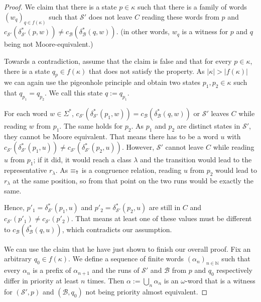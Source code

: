 \begin{proof}
	\vspace{5pt}
	
	We claim that there is a state $p \in \kappa$ such that there is a family of words $(w_q)_{q \in f(\kappa)}$ such that $\mathcal{S}'$ does not leave $C$ reading these words from $p$ and $c_{\mathcal{S}'}(\delta_{\mathcal{S}'}^*(p, w)) \neq c_{\mathcal{B}}(\delta_{\mathcal{B}}^*(q, w))$. (in other words, $w_q$ is a witness for $p$ and $q$ being not Moore-equivalent.)
	
	Towards a contradiction, assume that the claim is false and that for every $p \in \kappa$, there is a state $q_p \in f(\kappa)$ that does not satisfy the property. As $|\kappa| > |f(\kappa)|$ we can again use the pigeonhole principle and obtain two states $p_1, p_2 \in \kappa$ such that $q_{p_1} = q_{p_2}$. We call this state $q := q_{p_1}$.
	
	For each word $w \in \Sigma^*$, $c_{\mathcal{S}'}(\delta^*_{\mathcal{S'}}(p_1, w)) = c_{\mathcal{B}}(\delta^*_{\mathcal{B}}(q, w))$ or $\mathcal{S}'$ leaves $C$ while reading $w$ from $p_1$. The same holds for $p_2$. As $p_1$ and $p_2$ are distinct states in $\mathcal{S}'$, they cannot be Moore equivalent. That means there has to be a word $u$ with $c_{\mathcal{S}'}(\delta^*_{\mathcal{S'}}(p_1, u)) \neq c_{\mathcal{S}'}(\delta^*_{\mathcal{S'}}(p_2, u))$. However, $\mathcal{S}'$ cannot leave $C$ while reading $u$ from $p_1$; if it did, it would reach a class $\lambda$ and the transition would lead to the representative $r_\lambda$. As $\equiv_\text{\Ankh}$ is a congruence relation, reading $u$ from $p_2$ would lead to $r_\lambda$ at the same position, so from that point on the two runs would be exactly the same.
	
	Hence, $p'_1 = \delta_{\mathcal{S}'}^*(p_1, u)$ and $p'_2 = \delta_{\mathcal{S}'}^*(p_2, u)$ are still in $C$ and $c_{\mathcal{S}'}(p'_1) \neq c_{\mathcal{S}'}(p'_2)$. That means at least one of these values must be different to $c_{\mathcal{B}}(\delta_{\mathcal{B}}^*(q, u))$, which contradicts our assumption.
	
	\vspace{5pt}
	
	We can use the claim that he have just shown to finish our overall proof. Fix an arbitrary $q_0 \in f(\kappa)$. We define a sequence of finite words $(\alpha_n)_{n \in \mathbb{N}}$ such that every $\alpha_n$ is a prefix of $\alpha_{n+1}$ and the runs of $\mathcal{S}'$ and $\mathcal{B}$ from $p$ and $q_0$ respectively differ in priority at least $n$ times. Then $\alpha := \bigcup_n \alpha_n$ is an $\omega$-word that is a witness for $(\mathcal{S}', p)$ and $(\mathcal{B}, q_0)$ not being priority almost equivalent.
	

\end{proof}
